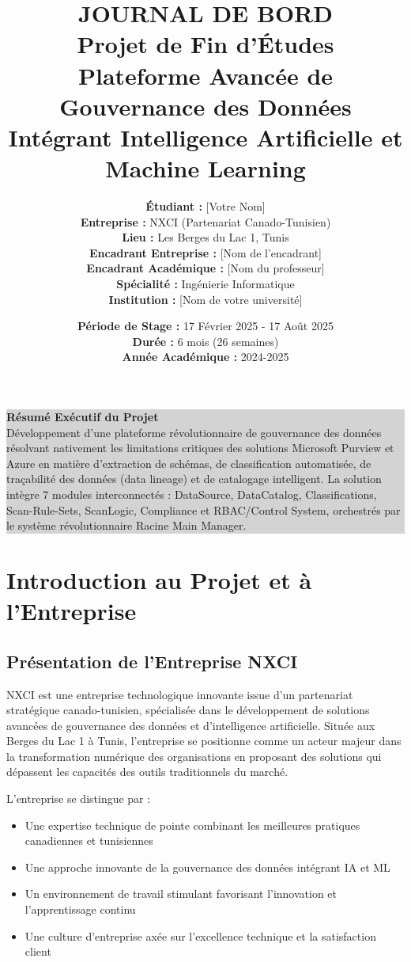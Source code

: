 \documentclass[a4paper,12pt]{article}
\title{
    \vspace{-2cm}
    {\Huge\textbf{JOURNAL DE BORD}}\\[0.5cm]
    {\LARGE Projet de Fin d'Études}\\[0.3cm]
    {\Large Plateforme Avancée de Gouvernance des Données}\\[0.2cm]
    {\large Intégrant Intelligence Artificielle et Machine Learning}
}
\author{
    \textbf{Étudiant :} [Votre Nom]\\[0.2cm]
    \textbf{Entreprise :} NXCI (Partenariat Canado-Tunisien)\\
    \textbf{Lieu :} Les Berges du Lac 1, Tunis\\[0.2cm]
    \textbf{Encadrant Entreprise :} [Nom de l'encadrant]\\
    \textbf{Encadrant Académique :} [Nom du professeur]\\[0.2cm]
    \textbf{Spécialité :} Ingénierie Informatique\\
    \textbf{Institution :} [Nom de votre université]
}
\date{
    \textbf{Période de Stage :} 17 Février 2025 - 17 Août 2025\\
    \textbf{Durée :} 6 mois (26 semaines)\\
    \textbf{Année Académique :} 2024-2025
}
\begin{document}
\maketitle
\thispagestyle{fancy}

\vspace{2cm}

\begin{center}
\colorbox{lightgray}{
\begin{minipage}{0.8\textwidth}
\centering
\textbf{\large Résumé Exécutif du Projet}\\[0.3cm]
Développement d'une plateforme révolutionnaire de gouvernance des données résolvant nativement les limitations critiques des solutions Microsoft Purview et Azure en matière d'extraction de schémas, de classification automatisée, de traçabilité des données (data lineage) et de catalogage intelligent. La solution intègre 7 modules interconnectés : DataSource, DataCatalog, Classifications, Scan-Rule-Sets, ScanLogic, Compliance et RBAC/Control System, orchestrés par le système révolutionnaire Racine Main Manager.
\end{minipage}
}
\end{center}

\newpage

\tableofcontents

\newpage

\section{Introduction au Projet et à l'Entreprise}

\subsection{Présentation de l'Entreprise NXCI}

NXCI est une entreprise technologique innovante issue d'un partenariat stratégique canado-tunisien, spécialisée dans le développement de solutions avancées de gouvernance des données et d'intelligence artificielle. Située aux Berges du Lac 1 à Tunis, l'entreprise se positionne comme un acteur majeur dans la transformation numérique des organisations en proposant des solutions qui dépassent les capacités des outils traditionnels du marché.

L'entreprise se distingue par :
\begin{itemize}
    \item Une expertise technique de pointe combinant les meilleures pratiques canadiennes et tunisiennes
    \item Une approche innovante de la gouvernance des données intégrant IA et ML
    \item Un environnement de travail stimulant favorisant l'innovation et l'apprentissage continu
    \item Une culture d'entreprise axée sur l'excellence technique et la satisfaction client
\end{itemize}
\end{document}
